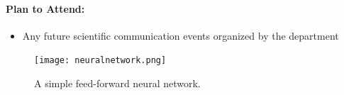 \documentclass[11pt,a4paper,oneside]{article}
\begin{document}
\paragraph{Plan to Attend:}
\begin{itemize}
	\item Any future scientific communication events organized by the department 
\end{itemize}
\pagebreak


\begin{appendices}
\begin{figure}
	\begin{center}
		\texttt{[image: neuralnetwork.png]}\\
	\end{center}
	\begin{flushleft}
		\caption{A simple feed-forward neural network. \label{fig:feedforward}} 
	\end{flushleft}
\end{figure} 


\end{appendices}
\end{document}
